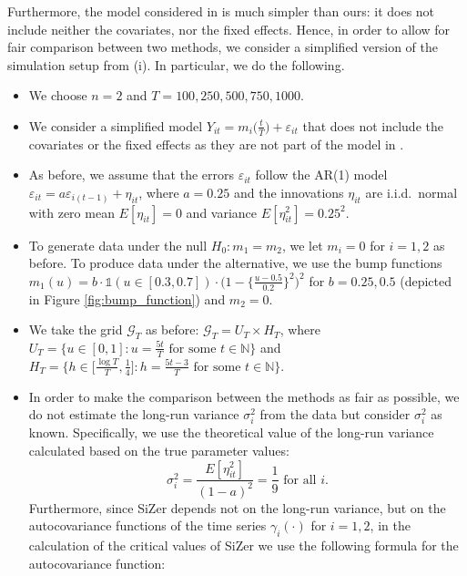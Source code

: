 \documentclass[12pt]{article}
\begin{document}
{Furthermore, the model considered in \cite{Park2009} is much simpler than ours: it does not include neither the covariates, nor the fixed effects. Hence, in order to allow for fair comparison between two methods, we consider a simplified version of the simulation setup from (i). In particular, we do the following.

\begin{itemize}[label=--,leftmargin=0.45cm,itemsep=0pt]

\item We choose $n=2$ and $T=100,250,500, 750, 1000$.

\item We consider a simplified model $Y_{it} = m_i\big(\frac{t}{T}\big) + \varepsilon_{it}$ that does not include the covariates or the fixed effects as they are not part of the model in \cite{Park2009}.
\item As before, we assume that the errors $\varepsilon_{it}$ follow the AR(1) model $\varepsilon_{it} = a \varepsilon_{i(t-1)} + \eta_{it}$, where $a=0.25$ and the innovations $\eta_{it}$ are i.i.d.\ normal with zero mean $E[\eta_{it}]=0$ and variance $E[\eta_{it}^2]=0.25^2$. 

\item To generate data under the null $H_0: m_1 = m_2$, we let $m_i = 0$ for $i=1, 2$ as before. To produce data under the alternative, we use the bump functions $m_1(u) = b \cdot \mathbb{1}(u \in [0.3, 0.7]) \cdot \big(1 - \big\{\frac{u - 0.5}{0.2}\big\}^2\big)^2$ for $b = 0.25, 0.5$ (depicted in Figure \ref{fig:bump_function}) and $m_2 = 0$.

\item We take the grid $\mathcal{G}_T$ as before: $\mathcal{G}_T = U_T \times H_T$, where $U_T = \big\{ u \in [0,1]: u = \textstyle{\frac{5t}{T}} \text{ for some } t \in \mathbb{N} \big\}$ and $H_T = \big\{ h \in \big[ \textstyle{\frac{\log T}{T}}, \textstyle{\frac{1}{4}} \big]:  h = \textstyle{\frac{5t - 3}{T}} \text{ for some } t \in \mathbb{N} \big\}$.

\item In order to make the comparison between the methods as fair as possible, we do not estimate the long-run variance $\sigma_i^2$ from the data but consider $\sigma_i^2$ as known. Specifically, we use the theoretical value of the long-run variance calculated based on the true parameter values: $$\sigma_i^2 = \frac{E[\eta_{it}^2]}{(1 - a)^2} = \frac{1}{9} \text{ for all }i.$$ Furthermore, since SiZer depends not on the long-run variance, but on the autocovariance functions of the time series $\gamma_i(\cdot)$ for $i=1, 2$, in the calculation of the critical values of SiZer we use the following formula for the autocovariance function:


\end{itemize}}
\end{document}
